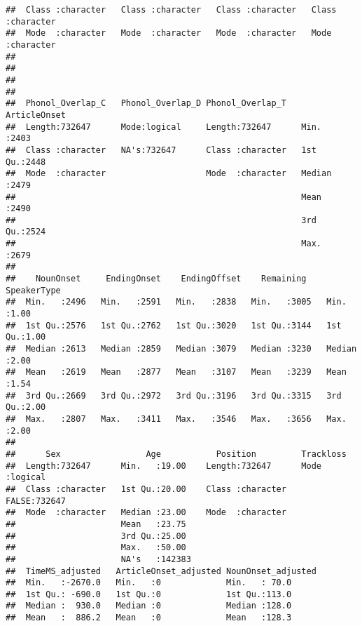 \documentclass[
]{article}
\begin{document}
\begin{verbatim}
##  Class :character   Class :character   Class :character   Class :character  
##  Mode  :character   Mode  :character   Mode  :character   Mode  :character  
##                                                                             
##                                                                             
##                                                                             
##                                                                             
##  Phonol_Overlap_C   Phonol_Overlap_D Phonol_Overlap_T    ArticleOnset 
##  Length:732647      Mode:logical     Length:732647      Min.   :2403  
##  Class :character   NA's:732647      Class :character   1st Qu.:2448  
##  Mode  :character                    Mode  :character   Median :2479  
##                                                         Mean   :2490  
##                                                         3rd Qu.:2524  
##                                                         Max.   :2679  
##                                                                       
##    NounOnset     EndingOnset    EndingOffset    Remaining     SpeakerType  
##  Min.   :2496   Min.   :2591   Min.   :2838   Min.   :3005   Min.   :1.00  
##  1st Qu.:2576   1st Qu.:2762   1st Qu.:3020   1st Qu.:3144   1st Qu.:1.00  
##  Median :2613   Median :2859   Median :3079   Median :3230   Median :2.00  
##  Mean   :2619   Mean   :2877   Mean   :3107   Mean   :3239   Mean   :1.54  
##  3rd Qu.:2669   3rd Qu.:2972   3rd Qu.:3196   3rd Qu.:3315   3rd Qu.:2.00  
##  Max.   :2807   Max.   :3411   Max.   :3546   Max.   :3656   Max.   :2.00  
##                                                                            
##      Sex                 Age           Position         Trackloss      
##  Length:732647      Min.   :19.00    Length:732647      Mode :logical  
##  Class :character   1st Qu.:20.00    Class :character   FALSE:732647   
##  Mode  :character   Median :23.00    Mode  :character                  
##                     Mean   :23.75                                      
##                     3rd Qu.:25.00                                      
##                     Max.   :50.00                                      
##                     NA's   :142383                                     
##  TimeMS_adjusted   ArticleOnset_adjusted NounOnset_adjusted
##  Min.   :-2670.0   Min.   :0             Min.   : 70.0     
##  1st Qu.: -690.0   1st Qu.:0             1st Qu.:113.0     
##  Median :  930.0   Median :0             Median :128.0     
##  Mean   :  886.2   Mean   :0             Mean   :128.3     

\end{verbatim}
\end{document}
